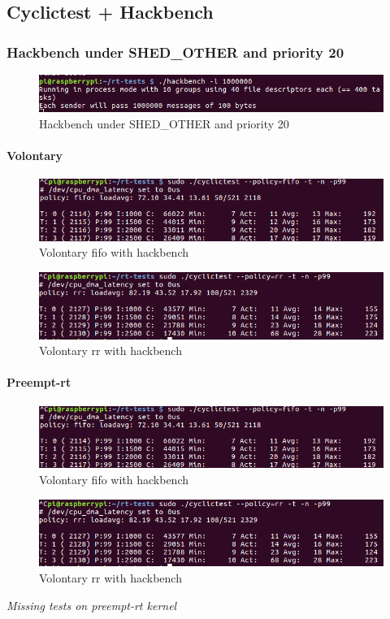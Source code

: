 \documentclass[10pt,a4paper]{article}
\begin{document}
\subsection{Cyclictest + Hackbench}
\subsubsection{Hackbench under SHED\_OTHER and priority 20}
\begin{figure}[H]
\includegraphics[width=16cm]{Volontary-other-Hackbench-p20.png}
\caption{Hackbench under SHED\_OTHER and priority 20}
\end{figure}
\paragraph{Volontary}
\begin{figure}[H]
\includegraphics[width=16cm]{Volontary-Fifo-WithHackbench1.png}
\caption{Volontary fifo with hackbench}
\end{figure}
\begin{figure}[H]
\includegraphics[width=16cm]{Volontary-Rr-WithHackbench1.png}
\caption{Volontary rr with hackbench}
\end{figure}
\paragraph{Preempt-rt}
\begin{figure}[H]
\includegraphics[width=16cm]{Volontary-Fifo-WithHackbench1.png}
\caption{Volontary fifo with hackbench}
\end{figure}
\begin{figure}[H]
\includegraphics[width=16cm]{Volontary-Rr-WithHackbench1.png}
\caption{Volontary rr with hackbench}
\end{figure}
\emph{Missing tests on preempt-rt kernel}
\end{document}
